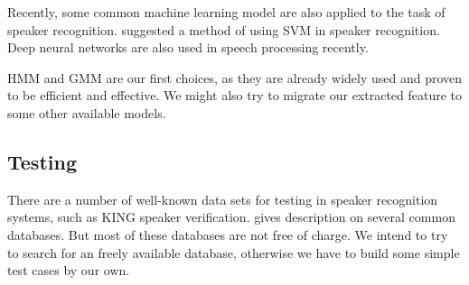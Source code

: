 \documentclass{article}
\begin{document}
Recently, some common machine learning model are also applied to the task of speaker
recognition. \cite{svm} suggested a method of using SVM in speaker recognition.
Deep neural networks are also used in speech processing recently.\cite{deep}

HMM and GMM are our first choices, as they are already widely used and proven to be
efficient and effective.  We might also try to migrate our extracted feature to
some other available models.

\subsection{Testing}
There are a number of well-known data sets for testing in speaker recognition systems,
such as KING speaker verification\cite{king}. \cite{database} gives description on
several common databases. But most of these databases are not free of charge.
We intend to try to search for an freely available database,
otherwise we have to build some simple test cases by our own.

\printbibliography
\end{document}
